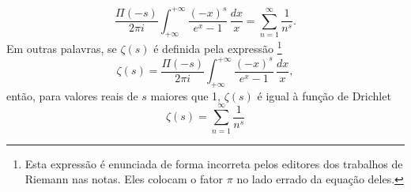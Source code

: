     \begin{equation}
        \label{extensao-zeta-1}
        \frac{\Pi(-s)}{2\pi i} \int_{+\infty}^{+\infty} \frac{(-x)^s}{e^x - 1} \, \frac{dx}{x} = \sum_{n=1}^{\infty}\frac{1}{n^s}.
    \end{equation}
    Em outras palavras, se $\zeta(s)$ é definida pela expressão
    \footnote{
    Esta expressão é enunciada de forma incorreta pelos editores dos trabalhos de Riemann nas notas. Eles colocam o fator $\pi$ no lado errado da equação deles.
    }
    \begin{equation}
        \label{extensao-zeta-2}
        \zeta(s) = \frac{\Pi(-s)}{2\pi i} \int_{+\infty}^{+\infty} \frac{(-x)^s}{e^x - 1} \, \frac{dx}{x},
    \end{equation}
    então, para valores reais de $s$ maiores que 1, $\zeta(s)$ é igual à função de Drichlet
    \begin{equation}
        \zeta(s) = \sum_{n=1}^{\infty}\frac{1}{n^s}
    \end{equation}
    
    
    
    
    
    
    
    
    
    
    
    
    
    
    
    
    
    
    
    
    
    
    
    
    














